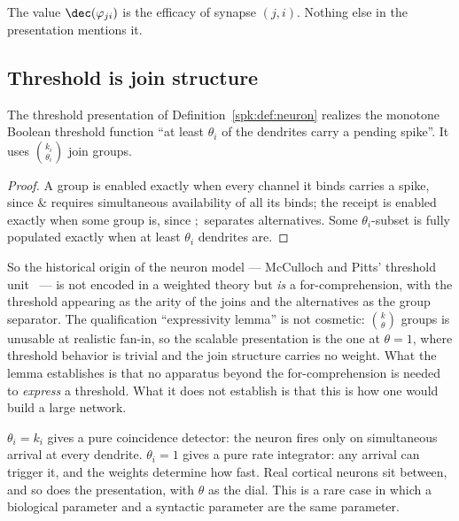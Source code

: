 The value $\dec(\varphi_{ji})$ is the efficacy of synapse $(j,i)$. Nothing else in the
presentation mentions it.

\subsection{Threshold is join structure}

\begin{proposition}
\label{spk:prop:mcp}
The threshold presentation of Definition~\ref{spk:def:neuron} realizes the monotone
Boolean threshold function ``at least $\theta_i$ of the dendrites carry a pending
spike''. It uses $\binom{k_i}{\theta_i}$ join groups.
\end{proposition}

\begin{proof}
A group is enabled exactly when every channel it binds carries a spike, since $\&$
requires simultaneous availability of all its binds; the receipt is enabled exactly when
some group is, since $;$ separates alternatives. Some $\theta_i$-subset is fully
populated exactly when at least $\theta_i$ dendrites are.
\end{proof}

So the historical origin of the neuron model --- McCulloch and Pitts' threshold
unit~\cite{mcp} --- is not encoded in a weighted theory but \emph{is} a
for-comprehension, with the threshold appearing as the arity of the joins and the
alternatives as the group separator. The qualification ``expressivity lemma'' is not
cosmetic: $\binom{k}{\theta}$ groups is unusable at realistic fan-in, so the scalable
presentation is the one at $\theta = 1$, where threshold behavior is trivial and the
join structure carries no weight. What the lemma establishes is that no apparatus beyond
the for-comprehension is needed to \emph{express} a threshold. What it does not establish
is that this is how one would build a large network.

\begin{remark}
\label{spk:rmk:dial}
$\theta_i = k_i$ gives a pure coincidence detector: the neuron fires only on simultaneous
arrival at every dendrite. $\theta_i = 1$ gives a pure rate integrator: any arrival can
trigger it, and the weights determine how fast. Real cortical neurons sit between, and so
does the presentation, with $\theta$ as the dial. This is a rare case in which a
biological parameter and a syntactic parameter are the same parameter.
\end{remark}

